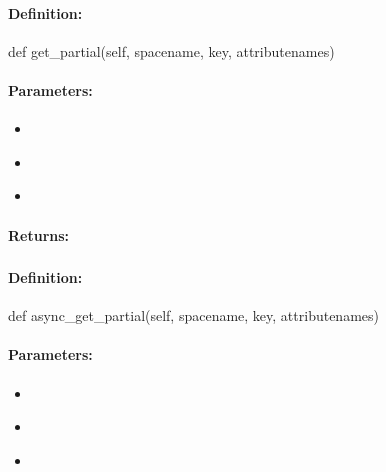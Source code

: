 \paragraph{Definition:}
\begin{pythoncode}
def get_partial(self, spacename, key, attributenames)
\end{pythoncode}

\paragraph{Parameters:}
\begin{itemize}[noitemsep]
\item {}\\

\item {}\\

\item {}\\

\end{itemize}

\paragraph{Returns:}


\pagebreak
\subsubsection{}
\label{api:python:async_get_partial}


\paragraph{Definition:}
\begin{pythoncode}
def async_get_partial(self, spacename, key, attributenames)
\end{pythoncode}

\paragraph{Parameters:}
\begin{itemize}[noitemsep]
\item {}\\

\item {}\\

\item {}\\

\end{itemize}

